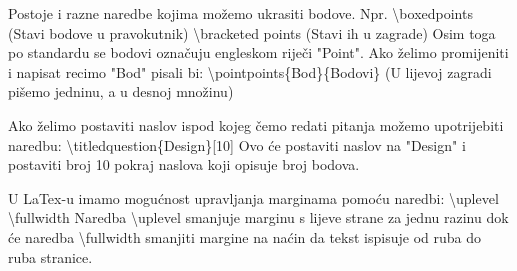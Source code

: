\documentclass[addpoints,answers]{beamer}
\newcounter{points}
\begin{document}
\begin{frame}
Postoje i razne naredbe kojima možemo ukrasiti bodove. Npr.
\newline
\newline
\color{blue}
\textbackslash{boxedpoints}
\color{black}
(Stavi bodove u pravokutnik)
\color{blue}
\newline
\newline
\color{blue}
\textbackslash{bracketed points}
\color{black}
(Stavi ih u zagrade)
\newline
\newline
Osim toga po standardu se bodovi označuju engleskom riječi "Point". Ako želimo promijeniti i napisat recimo "Bod" pisali bi:
\newline
\newline
\color{blue}
\textbackslash{pointpoints\{Bod\}\{Bodovi\}}
\color{black}
\newline
(U lijevoj zagradi pišemo jedninu, a u desnoj množinu)
\color{blue}
\end{frame}

\begin{frame}
Ako želimo postaviti naslov ispod kojeg čemo redati pitanja možemo upotrijebiti naredbu:
\newline
\newline
\color{blue}
\textbackslash{titledquestion\{Design\}[10]}
\color{black}
\newline
\newline
Ovo će postaviti naslov na "Design" i postaviti broj 10 pokraj naslova koji opisuje broj bodova.
\end{frame}



%
%
%

\begin{frame}
U LaTex-u imamo mogućnost upravljanja marginama pomoću naredbi:
\newline
\newline
\color{blue}
\textbackslash{uplevel}
\newline
\newline
\color{black}
\color{blue}
\textbackslash{fullwidth}
\color{black}
\newline
\newline
Naredba \color{blue}\textbackslash{uplevel} \color{black} smanjuje marginu s lijeve strane za jednu razinu dok će naredba \color{blue} \textbackslash{fullwidth} \color{black} smanjiti margine na naćin da tekst ispisuje od ruba do ruba stranice.
\end{frame}
\end{document}
